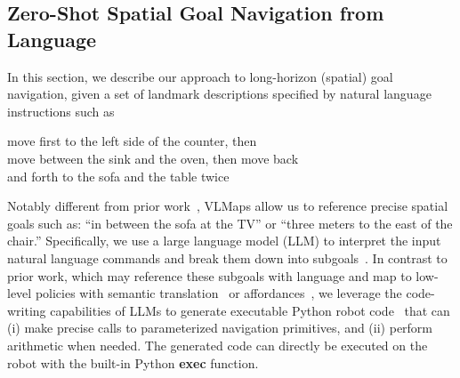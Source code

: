 \documentclass[letterpaper, 10 pt, conference]{ieeeconf}  %
\newcommand{\prompt}[1]{\textcolor{prompt-gray}{#1}}
\newcommand{\lmp}[1]{
\begin{tcolorbox}[boxsep=0pt,
                  left=3pt,
                  right=-4pt,
                  top=3pt,
                  bottom=3pt,
                  arc=0pt,
                  boxrule=0.5pt,
                  colframe=light-gray,
                  colback=white
                  ]
\small{  %
\ttfamily
#1
}
\end{tcolorbox}
}
\begin{document}
\subsection{Zero-Shot Spatial Goal Navigation from Language}
\label{sec:sub_language_spatial_navigation}
In this section, we describe our approach to long-horizon (spatial) goal navigation, given a set of landmark descriptions specified by natural language instructions such as
\lmp{
\prompt{
move first to the left side of the counter, then \\
move between the sink and the oven, then move back \\
and forth to the sofa and the table twice
}
}
\noindent Notably different from prior work~\cite{gadre2022clip, shah2022lm}, VLMaps allow us to reference precise spatial goals such as: ``in between the sofa at the TV'' or ``three meters to the east of the chair.''
Specifically, we use a large language model (LLM) to interpret the input natural language commands and break them down into subgoals~\cite{ahn2022can,shah2022lm,zeng2022socratic}. In contrast to prior work, which may reference these subgoals with language and map to low-level policies with semantic translation~\cite{huang2022language} or affordances~\cite{ahn2022can,huang2022inner,zeng2019learning, borja22icra}, we leverage the code-writing capabilities of LLMs to generate executable Python robot code~\cite{liang2022code,mees22hulc2,chen2021evaluating,brown2020language} that can (i) make precise calls to parameterized navigation primitives, and (ii) perform arithmetic when needed. The generated code can directly be executed on the robot with the built-in Python \textbf{exec} function.
\end{document}
